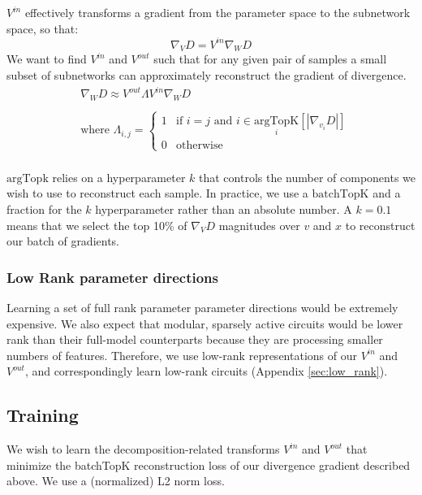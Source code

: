 \documentclass{article}
\theoremstyle{plain}
\theoremstyle{definition}
\theoremstyle{remark}
\begin{document}
$V^{in}$ effectively transforms a gradient from the parameter space to the subnetwork space, so that: 
\begin{equation}
    \nabla_V D = V^{in} \nabla_W D
\end{equation}
We want to find $V^{in}$ and $V^{out}$ such that for any given pair of samples a small subset of subnetworks can approximately reconstruct the gradient of divergence. 
\begin{align}
    & \nabla_W D \approx V^{out} \Lambda V^{in} \nabla_W D \\\\
    & \text{where }  
    \Lambda_{i,j} = 
    \begin{cases} 
        1 & \text{if } i = j \text{ and } i \in \underset{i}{\text{argTopK}} \left[ \left| \nabla_{v_i} D \right| \right] \\ 
        0 & \text{otherwise}
    \end{cases} \\
\end{align}

$\text{argTopk}$ relies on a hyperparameter $k$ that controls the number of components we wish to use to reconstruct each sample. In practice, we use a $\text{batchTopK}$ \cite{bussmann2024batchtopk} and a fraction for the $k$ hyperparameter rather than an absolute number. A $k=0.1$ means that we select the top 10\% of $\nabla_V D$ magnitudes over $v$ and $x$ to reconstruct our batch of gradients.

\subsubsection{Low Rank parameter directions}
Learning a set of full rank parameter parameter directions would be extremely expensive. We also expect that modular, sparsely active circuits would be lower rank than their full-model counterparts because they are processing smaller numbers of features. Therefore, we use low-rank representations of our $V^{in}$ and $V^{out}$, and correspondingly learn low-rank circuits (Appendix \ref{sec:low_rank}). 

\subsection{Training}\label{subsec:training}
We wish to learn the decomposition-related transforms $V^{in}$ and $V^{out}$ that minimize the batchTopK reconstruction loss of our divergence gradient described above. We use a (normalized) L2 norm loss.
\end{document}
